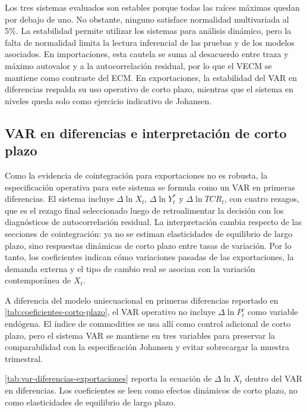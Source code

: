 \documentclass[11pt,a4paper]{article}
\begin{document}
Los tres sistemas evaluados son estables porque todas las raíces máximas quedan
por debajo de uno. No obstante, ninguno satisface normalidad multivariada al
5\%. La estabilidad permite utilizar los sistemas para análisis dinámico, pero
la falta de normalidad limita la lectura inferencial de las pruebas y de los
modelos asociados. En importaciones, esta cautela se suma al desacuerdo entre
traza y máximo autovalor y a la autocorrelación residual, por lo que el VECM se
mantiene como contraste del ECM. En exportaciones, la estabilidad del VAR en
diferencias respalda su uso operativo de corto plazo, mientras que el sistema
en niveles queda solo como ejercicio indicativo de Johansen.

	\subsection{VAR en diferencias e interpretación de corto plazo}
	\label{subsec:resultados-var}

	Como la evidencia de cointegración para exportaciones no es robusta, la
	especificación operativa para este sistema se formula como un VAR en primeras
	diferencias. El sistema incluye \(\Delta \ln X_t\),
	\(\Delta \ln Y_t^*\) y \(\Delta \ln TCR_t\), con cuatro rezagos,
	que es el rezago final seleccionado luego de retroalimentar la decisión con los
	diagnósticos de autocorrelación residual. La interpretación cambia respecto de
	las secciones de cointegración: ya no se estiman elasticidades de equilibrio de
	largo plazo, sino respuestas dinámicas de corto plazo entre tasas de variación.
	Por lo tanto, los coeficientes indican cómo variaciones pasadas de las
	exportaciones, la demanda externa y el tipo de cambio real se asocian con la
	variación contemporánea de \(X_t\).

	A diferencia del modelo uniecuacional en primeras diferencias reportado en
	\autoref{tab:coeficientes-corto-plazo}, el VAR operativo no incluye
	\(\Delta \ln P_t^c\) como variable endógena. El índice de commodities se usa
	allí como control adicional de corto plazo, pero el sistema VAR se mantiene en
	tres variables para preservar la comparabilidad con la especificación Johansen
	y evitar sobrecargar la muestra trimestral.

	\autoref{tab:var-diferencias-exportaciones} reporta la ecuación de
	\(\Delta \ln X_t\) dentro del VAR en diferencias. Los coeficientes se leen como
	efectos dinámicos de corto plazo, no como elasticidades de equilibrio de largo
	plazo.
\end{document}
